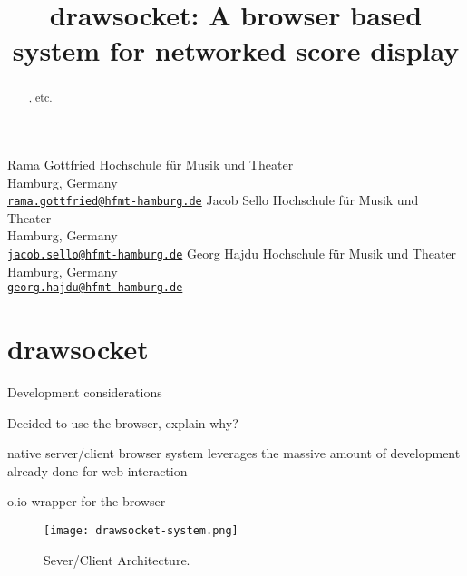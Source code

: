 

\def\papertitle{drawsocket: A browser based system for networked score display%
}
\def\firstauthor{Rama Gottfried}
\def\secondauthor{Jacob Sello}
\def\thirdauthor{Georg Hajdu}

\title{\papertitle}
 \threeauthors
   {\firstauthor} {
   Hochschule f\"ur Musik und Theater\\
   Hamburg, Germany \\ %
   \small{\tt \href{mailto:rama.gottfried@hfmt-hamburg.de}{rama.gottfried@hfmt-hamburg.de}}}
    {\secondauthor} {
   Hochschule f\"ur Musik und Theater\\
   Hamburg, Germany \\ %
   \small{\tt \href{mailto:jacob.sello@hfmt-hamburg.de}{jacob.sello@hfmt-hamburg.de}}}
   {\thirdauthor} {
   Hochschule f\"ur Musik und Theater\\
   Hamburg, Germany \\ %
   \small{\tt \href{mailto:georg.hajdu@hfmt-hamburg.de}{georg.hajdu@hfmt-hamburg.de}}}





%

\capstartfalse
\maketitle
\capstarttrue
%
\begin{abstract}
 \drawsocket, \maxscore etc.

\end{abstract}





\section{drawsocket}\label{sec:drawsocket}


Development considerations

Decided to use the browser, explain why?

native server/client browser system leverages the massive amount of development already done for web interaction

o.io wrapper for the browser\cite{freed2014io, maccallum2015dynamic}
\begin{figure*}[]
\centering
\texttt{[image: drawsocket-system.png]}
\caption{\drawsocket Sever/Client Architecture. 
\label{fig:drawsocket-arch}}
\end{figure*}

